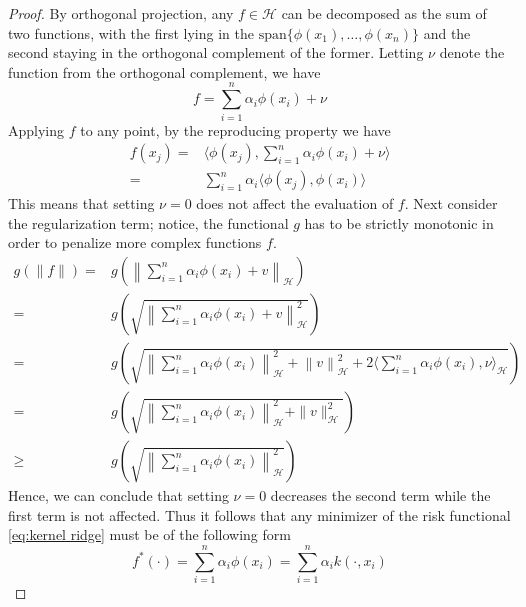 \begin{proof}
    By orthogonal projection, any $f \in \mathcal{H}$ can be decomposed as the sum of two functions, with the first lying in the $\textrm{span}\{\phi(x_1),\dots, \phi(x_n)\}$ and the second staying in the orthogonal complement of the former. Letting $\nu$ denote the function from the orthogonal complement, we have
    \begin{equation}
        f=\sum\limits_{i=1}^{n}\alpha_i \phi(x_i)+\nu
    \end{equation}
    Applying $f$ to any point, by the reproducing property we have
    \begin{equation}
        \begin{aligned}
            f(x_j)=&\langle \phi(x_j), \sum\limits_{i=1}^{n}\alpha_i \phi(x_i)+\nu\rangle
            \\
            =&\sum\limits_{i=1}^{n}\alpha_i\langle \phi(x_j), \phi(x_i)\rangle
        \end{aligned}
    \end{equation}
    This means that setting $\nu=0$ does not affect the evaluation of $f$.
    Next consider the regularization term; notice, the functional $g$ has to be strictly monotonic in order to penalize more complex functions $f$.
    \begin{equation}
        \begin{aligned}
            g(\|f\|)=&g\left(\left\|\sum\limits_{i=1}^n \alpha_i \phi(x_i)+v\right\|_\mathcal{H}\right)
            \\
            =&g\left(\sqrt{\left\|\sum\limits_{i=1}^n \alpha_i \phi(x_i)+v\right\|_\mathcal{H}^2}\right)
            \\
            =&g\left(\sqrt{\left\|\sum\limits_{i=1}^n \alpha_i \phi(x_i)\right\|_{\mathcal{H}}^2+\left\|v\right\|_\mathcal{H}^2+2\langle\sum\limits_{i=1}^n \alpha_i \phi(x_i),\nu \rangle_{\mathcal{H}}}\right)
            \\
            =&g\left(\sqrt{\left\|\sum\limits_{i=1}^n \alpha_i \phi(x_i)\right\|_{\mathcal{H}}^2+\|v\|_\mathcal{H}^2}\right)
            \\
            \geq &g\left(\sqrt{\left\|\sum\limits_{i=1}^n \alpha_i \phi(x_i)\right\|_{\mathcal{H}}^2}\right)
        \end{aligned}
    \end{equation}
    Hence, we can conclude that setting $\nu=0$ decreases the second term while the first term is not affected. Thus it follows that any minimizer of the risk functional \ref{eq:kernel ridge} must be of the following form
    \begin{equation}
        f^*(\cdot)=\sum\limits_{i=1}^n \alpha_i \phi(x_i)=\sum\limits_{i=1}^n \alpha_i k(\cdot, x_i)
    \end{equation}
\end{proof}

